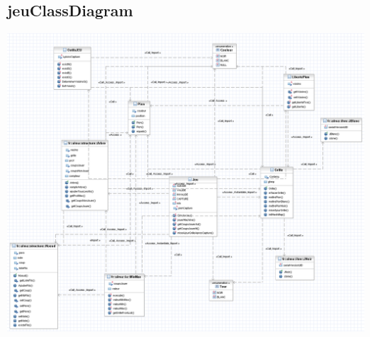 \documentclass{report}
\begin{document}
\subsection*{jeuClassDiagram}
\begin{center}
\includegraphics[scale=0.50]{images/fralmajeuClassDiagram}
\end{center}
\end{document}
